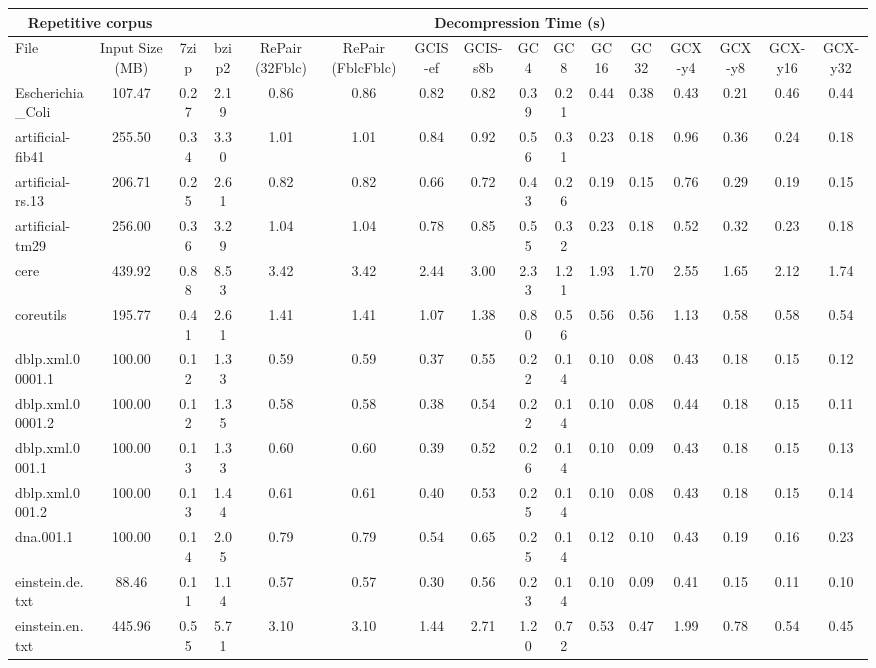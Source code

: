 \begin{table}[]
\centering
\begin{tabular}{|l|c|c|c|c|c|c|c|c|c|c|c|c|c|c|c|}
\hline
\multicolumn{2}{|c|}{Repetitive corpus} & \multicolumn{14}{c|}{Decompression Time (s)} \\
\hline
File & Input Size (MB) & 7zip & bzip2 & RePair (32Fblc) & RePair (FblcFblc) & GCIS-ef & GCIS-s8b & GC4 & GC8 & GC16 & GC32 & GCX-y4 & GCX-y8 & GCX-y16 & GCX-y32 \\
\hline
Escherichia\_Coli & 107.47 & 0.27 & 2.19 & 0.86 & 0.86 & 0.82 & 0.82 & 0.39 & 0.21 & 0.44 & 0.38 & 0.43 & 0.21 & 0.46 & 0.44 \\
\hline
artificial-fib41 & 255.50 & 0.34 & 3.30 & 1.01 & 1.01 & 0.84 & 0.92 & 0.56 & 0.31 & 0.23 & 0.18 & 0.96 & 0.36 & 0.24 & 0.18 \\
\hline
artificial-rs.13 & 206.71 & 0.25 & 2.61 & 0.82 & 0.82 & 0.66 & 0.72 & 0.43 & 0.26 & 0.19 & 0.15 & 0.76 & 0.29 & 0.19 & 0.15 \\
\hline
artificial-tm29 & 256.00 & 0.36 & 3.29 & 1.04 & 1.04 & 0.78 & 0.85 & 0.55 & 0.32 & 0.23 & 0.18 & 0.52 & 0.32 & 0.23 & 0.18 \\
\hline
cere & 439.92 & 0.88 & 8.53 & 3.42 & 3.42 & 2.44 & 3.00 & 2.33 & 1.21 & 1.93 & 1.70 & 2.55 & 1.65 & 2.12 & 1.74 \\
\hline
coreutils & 195.77 & 0.41 & 2.61 & 1.41 & 1.41 & 1.07 & 1.38 & 0.80 & 0.56 & 0.56 & 0.56 & 1.13 & 0.58 & 0.58 & 0.54 \\
\hline
dblp.xml.00001.1 & 100.00 & 0.12 & 1.33 & 0.59 & 0.59 & 0.37 & 0.55 & 0.22 & 0.14 & 0.10 & 0.08 & 0.43 & 0.18 & 0.15 & 0.12 \\
\hline
dblp.xml.00001.2 & 100.00 & 0.12 & 1.35 & 0.58 & 0.58 & 0.38 & 0.54 & 0.22 & 0.14 & 0.10 & 0.08 & 0.44 & 0.18 & 0.15 & 0.11 \\
\hline
dblp.xml.0001.1 & 100.00 & 0.13 & 1.33 & 0.60 & 0.60 & 0.39 & 0.52 & 0.26 & 0.14 & 0.10 & 0.09 & 0.43 & 0.18 & 0.15 & 0.13 \\
\hline
dblp.xml.0001.2 & 100.00 & 0.13 & 1.44 & 0.61 & 0.61 & 0.40 & 0.53 & 0.25 & 0.14 & 0.10 & 0.08 & 0.43 & 0.18 & 0.15 & 0.14 \\
\hline
dna.001.1 & 100.00 & 0.14 & 2.05 & 0.79 & 0.79 & 0.54 & 0.65 & 0.25 & 0.14 & 0.12 & 0.10 & 0.43 & 0.19 & 0.16 & 0.23 \\
\hline
einstein.de.txt & 88.46 & 0.11 & 1.14 & 0.57 & 0.57 & 0.30 & 0.56 & 0.23 & 0.14 & 0.10 & 0.09 & 0.41 & 0.15 & 0.11 & 0.10 \\
\hline
einstein.en.txt & 445.96 & 0.55 & 5.71 & 3.10 & 3.10 & 1.44 & 2.71 & 1.20 & 0.72 & 0.53 & 0.47 & 1.99 & 0.78 & 0.54 & 0.45 \\

\end{tabular}
\end{table}
